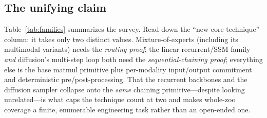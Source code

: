 \subsection{The unifying claim}
\label{sec:unifying}

Table~\ref{tab:families} summarizes the survey. Read down the ``new core technique''
column: it takes only two distinct values. Mixture-of-experts (including its multimodal
variants) needs the \emph{routing proof}; the linear-recurrent/SSM family \emph{and}
diffusion's multi-step loop both need the \emph{sequential-chaining proof}; everything
else is the base matmul primitive plus per-modality input/output commitment and
deterministic pre/post-processing. That the recurrent backbones and the diffusion sampler
collapse onto the \emph{same} chaining primitive---despite looking unrelated---is what
caps the technique count at two and makes whole-zoo coverage a finite, enumerable
engineering task rather than an open-ended one.


